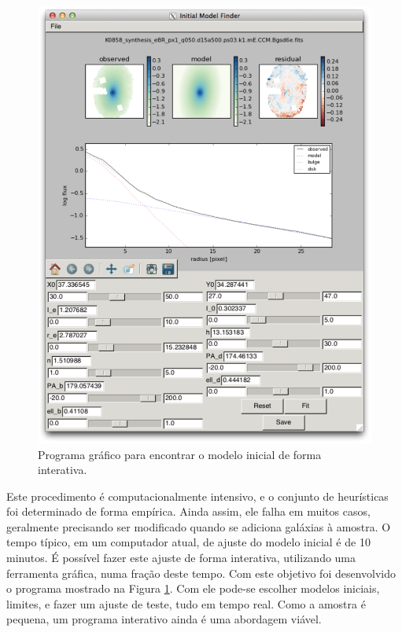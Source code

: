 \begin{figure}
	\includegraphics[width=1.0\columnwidth]{figuras/model_finder}
	\caption[Programa gráfico para encontrar o modelo inicial]
	{Programa gráfico para encontrar o modelo inicial de forma interativa.}
	\label{fig:modelFinder}
\end{figure}

Este procedimento é computacionalmente intensivo, e o conjunto de heurísticas
foi determinado de forma empírica. Ainda assim, ele falha em muitos casos,
geralmente precisando ser modificado quando se adiciona galáxias à amostra. O
tempo típico, em um computador atual, de ajuste do modelo inicial é de 10
minutos. É possível fazer este ajuste de forma interativa, utilizando uma
ferramenta gráfica, numa fração deste tempo. Com este objetivo foi desenvolvido
o programa mostrado na Figura \ref{fig:modelFinder}. Com ele pode-se escolher
modelos iniciais, limites, e fazer um ajuste de teste, tudo em tempo real. Como
a amostra é pequena, um programa interativo ainda é uma abordagem viável.

